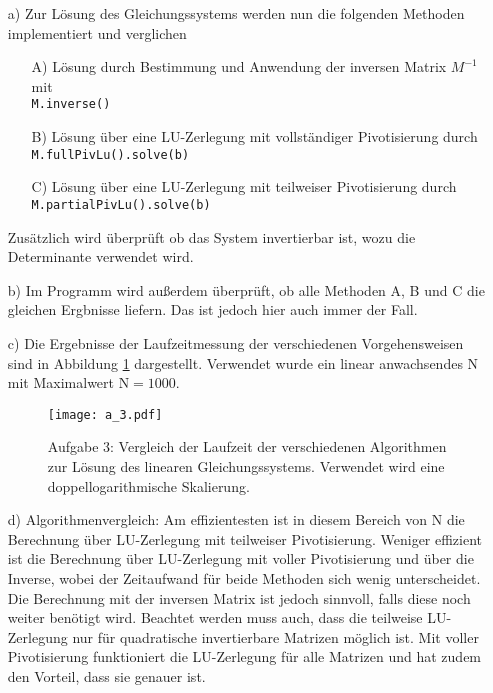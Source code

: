 \begin{itemize}[leftmargin=*]
\item[a)] Zur Lösung des Gleichungssystems werden nun die folgenden Methoden implementiert und verglichen
\begin{itemize}[leftmargin=*]
  \item[A)] Lösung durch Bestimmung und Anwendung der inversen Matrix $M^{-1}$ mit \\ \texttt{M.inverse()}
  \item[B)] Lösung über eine LU-Zerlegung mit vollständiger Pivotisierung durch \\ \texttt{M.fullPivLu().solve(b)}
  \item[C)] Lösung über eine LU-Zerlegung mit teilweiser Pivotisierung durch \\  \texttt{M.partialPivLu().solve(b)}
\end{itemize}
Zusätzlich wird überprüft ob das System invertierbar ist, wozu die Determinante verwendet wird.
\item[b)] Im Programm wird außerdem überprüft, ob alle Methoden A, B und C die gleichen Ergbnisse liefern. Das ist
jedoch hier auch immer der Fall.
\item[c)] Die Ergebnisse der Laufzeitmessung der verschiedenen Vorgehensweisen sind in Abbildung \ref{fig:plot3} dargestellt.
Verwendet wurde ein linear anwachsendes N mit Maximalwert $\text{N} = 1000$.
\FloatBarrier
\begin{figure}[h]
    \centering
    \texttt{[image: a\_3.pdf]}
    \caption{Aufgabe 3: Vergleich der Laufzeit der verschiedenen  Algorithmen zur Lösung des linearen Gleichungssystems. Verwendet wird eine doppellogarithmische Skalierung.}
    \label{fig:plot3}
\end{figure}
\FloatBarrier
\item[d)] Algorithmenvergleich: Am effizientesten ist in diesem Bereich von N die Berechnung über LU-Zerlegung mit
teilweiser Pivotisierung. Weniger effizient ist die Berechnung über LU-Zerlegung mit voller Pivotisierung
und über die Inverse, wobei der Zeitaufwand für beide Methoden sich wenig unterscheidet. Die Berechnung mit der inversen
Matrix ist jedoch sinnvoll, falls diese noch weiter benötigt wird. Beachtet werden muss auch, dass die teilweise LU-Zerlegung
nur für quadratische invertierbare Matrizen möglich ist. Mit voller Pivotisierung funktioniert die LU-Zerlegung für alle Matrizen und
hat zudem den Vorteil, dass sie genauer ist.
\end{itemize}



